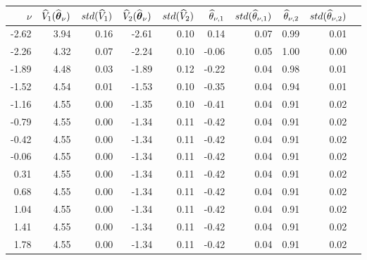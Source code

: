 \begin{tabular}{rrrrrrrrrr}\hline 
$\nu$  & $\widehat{V}_1(\widehat{\boldsymbol{\theta}}_{\nu})$ & $std(\widehat{V}_1)$ & $\widehat{V}_2(\widehat{\boldsymbol{\theta}}_{\nu})$ & $std(\widehat{V}_2)$ & $\widehat{\theta}_{\nu,1}$ & $std(\widehat{\theta}_{\nu,1})$ & $\widehat{\theta}_{\nu,2}$ & $std(\widehat{\theta}_{\nu,2})$ \\ \hline 
-2.62 &     3.94 &     0.16  &    -2.61 &      0.10 &      0.14 &      0.07 &      0.99 &      0.01 \\ 
-2.26 &     4.32 &     0.07  &    -2.24 &      0.10 &     -0.06 &      0.05 &      1.00 &      0.00 \\ 
-1.89 &     4.48 &     0.03  &    -1.89 &      0.12 &     -0.22 &      0.04 &      0.98 &      0.01 \\ 
-1.52 &     4.54 &     0.01  &    -1.53 &      0.10 &     -0.35 &      0.04 &      0.94 &      0.01 \\ 
-1.16 &     4.55 &     0.00  &    -1.35 &      0.10 &     -0.41 &      0.04 &      0.91 &      0.02 \\ 
-0.79 &     4.55 &     0.00  &    -1.34 &      0.11 &     -0.42 &      0.04 &      0.91 &      0.02 \\ 
-0.42 &     4.55 &     0.00  &    -1.34 &      0.11 &     -0.42 &      0.04 &      0.91 &      0.02 \\ 
-0.06 &     4.55 &     0.00  &    -1.34 &      0.11 &     -0.42 &      0.04 &      0.91 &      0.02 \\ 
 0.31 &     4.55 &     0.00  &    -1.34 &      0.11 &     -0.42 &      0.04 &      0.91 &      0.02 \\ 
 0.68 &     4.55 &     0.00  &    -1.34 &      0.11 &     -0.42 &      0.04 &      0.91 &      0.02 \\ 
 1.04 &     4.55 &     0.00  &    -1.34 &      0.11 &     -0.42 &      0.04 &      0.91 &      0.02 \\ 
 1.41 &     4.55 &     0.00  &    -1.34 &      0.11 &     -0.42 &      0.04 &      0.91 &      0.02 \\ 
 1.78 &     4.55 &     0.00  &    -1.34 &      0.11 &     -0.42 &      0.04 &      0.91 &      0.02 \\ 

\end{tabular}
